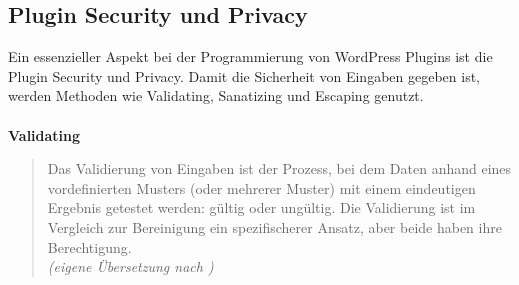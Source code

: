 \subsection{Plugin Security und Privacy}
Ein essenzieller Aspekt bei der Programmierung von WordPress Plugins ist die Plugin Security und Privacy.
Damit die Sicherheit von Eingaben gegeben ist, werden Methoden wie Validating, Sanatizing und Escaping genutzt.
\\\\
\textbf{Validating}

\begin{quote}
 Das Validierung von Eingaben ist der Prozess, bei dem Daten anhand eines vordefinierten Musters (oder mehrerer Muster) mit einem eindeutigen Ergebnis getestet werden: gültig oder ungültig.
 Die Validierung ist im Vergleich zur Bereinigung ein spezifischerer Ansatz, aber beide haben ihre Berechtigung.
 \\[0.5em]
 \emph{(eigene Übersetzung nach \cite{wordpress2024plugin_validation})}
\end{quote}

